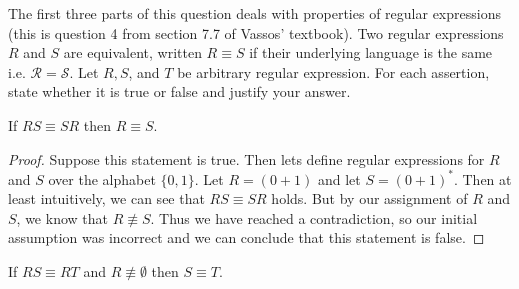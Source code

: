 \def \cL{\mathcal{L}}

The first three parts of this question deals with 
properties of regular expressions (this is question 4 from 
section 7.7 of Vassos' textbook). Two regular expressions 
$R$ and $S$ are equivalent, written $R \equiv S$ if their 
underlying language is the same i.e. $\mathcal{R} = \mathcal{S}$. 
Let $R, S$, and $T$ be arbitrary regular expression. For 
each assertion, state whether it is true or false and 
justify your answer. 

	\begin{center}
		If $RS \equiv SR$ then $R \equiv S$.	
	\end{center}
	
	\begin{proof}
	    Suppose this statement is true. Then lets define regular
	    expressions for $R$ and $S$ over the alphabet $\{ 0, 1 \}$.
	    Let $R = (0 + 1)$ and let $S = (0 + 1)^*$. Then at least 
	    intuitively, we can see that $RS \equiv SR$ holds.
	    But by our assignment of $R$ and $S$, we know that
	    $R \not\equiv S$. Thus we have reached a contradiction, so
	    our initial assumption was incorrect and we can conclude
	    that this statement is false.
	\end{proof}

	\begin{center}
		If $RS \equiv RT$ and $R \not\equiv \emptyset$ then $S \equiv T$.
	\end{center}
	
